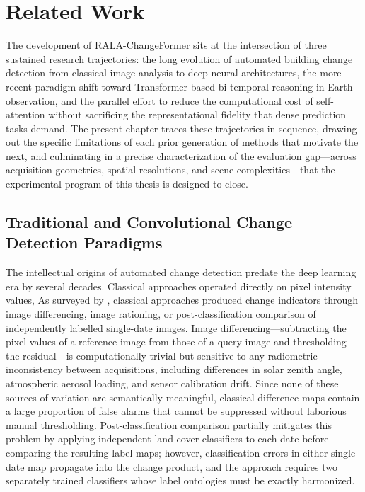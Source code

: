 \chapter{Related Work}
\label{chap:related_work}

The development of RALA-ChangeFormer sits at the intersection of three
sustained research trajectories: the long evolution of automated building
change detection from classical image analysis to deep neural architectures,
the more recent paradigm shift toward Transformer-based bi-temporal reasoning
in Earth observation, and the parallel effort to reduce the computational cost
of self-attention without sacrificing the representational fidelity that dense
prediction tasks demand. The present chapter traces these trajectories in
sequence, drawing out the specific limitations of each prior generation of
methods that motivate the next, and culminating in a precise characterization
of the evaluation gap---across acquisition geometries, spatial resolutions,
and scene complexities---that the experimental program of this thesis is
designed to close.


\section{Traditional and Convolutional Change Detection Paradigms}
\label{sec:supervised-bcd}

The intellectual origins of automated change detection predate the deep
learning era by several decades. Classical approaches operated directly on
pixel intensity values, As surveyed by \cite{Hussain2013Review}, classical approaches produced change
indicators through image differencing, image rationing, or post-classification
comparison of independently labelled single-date images. Image differencing---subtracting
the pixel values of a reference image from those of a query image and
thresholding the residual---is computationally trivial but sensitive to any
radiometric inconsistency between acquisitions, including differences in solar
zenith angle, atmospheric aerosol loading, and sensor calibration drift. Since
none of these sources of variation are semantically meaningful, classical
difference maps contain a large proportion of false alarms that cannot be
suppressed without laborious manual thresholding. Post-classification
comparison partially mitigates this problem by applying independent land-cover
classifiers to each date before comparing the resulting label maps; however,
classification errors in either single-date map propagate into the change
product, and the approach requires two separately trained classifiers whose
label ontologies must be exactly harmonized.

